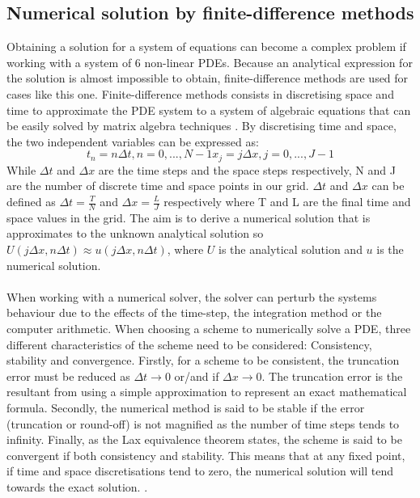 \subsection{Numerical solution by finite-difference methods}
Obtaining a solution for a system of equations can become a complex problem if working with a system of 6 non-linear PDEs. Because an analytical expression for the solution is almost impossible to obtain, finite-difference methods are used for cases like this one. Finite-difference methods consists in discretising space and time to approximate the PDE system to a system of algebraic equations that can be easily solved by matrix algebra techniques \parencite{morton2005numerical}. By discretising time and space, the two independent variables can be expressed as:
\begin{subequations}
    \begin{equation}
        t_{n} = n\Delta t, n=0,...,N-1
    \end{equation}
    \begin{equation}
        x_{j} = j\Delta x, j=0,...,J-1
    \end{equation}
\end{subequations}
While $\Delta t$ and $\Delta x$ are the time steps and the space steps respectively, N and J are the number of discrete time and space points in our grid. $\Delta t$ and $\Delta x$ can be defined as $ \Delta t = \frac{T}{N}$ and $   \Delta x= \frac{L}{J}$ respectively where T and L are the final time and space values in the grid. The aim is to derive a numerical solution that is approximates to the unknown analytical solution so $U(j\Delta x, n\Delta t)\approx u( j\Delta x, n\Delta t)$, where $U$ is the analytical solution and $u$ is the numerical solution. \\\\
When working with a numerical solver, the solver can perturb the systems behaviour due to the effects of the time-step, the integration method or the computer arithmetic. When choosing a scheme to numerically solve a PDE, three different characteristics of the scheme need to be considered: Consistency, stability and convergence. Firstly, for a scheme to be consistent, the truncation error must be reduced as $\Delta t \rightarrow 0$ or/and if $\Delta x \rightarrow 0$. The truncation error is the resultant from using a simple approximation to represent an exact mathematical formula. Secondly, the numerical method is said to be stable if the error (truncation or round-off) is not magnified as the number of time steps tends to infinity. Finally, as the Lax equivalence theorem states, the scheme is said to be convergent if both consistency and stability. This means that at any fixed point, if  time and space discretisations tend to zero, the numerical solution will tend towards the exact solution. \parencite{smith1985numerical, ferzigerperic}.\\\\
